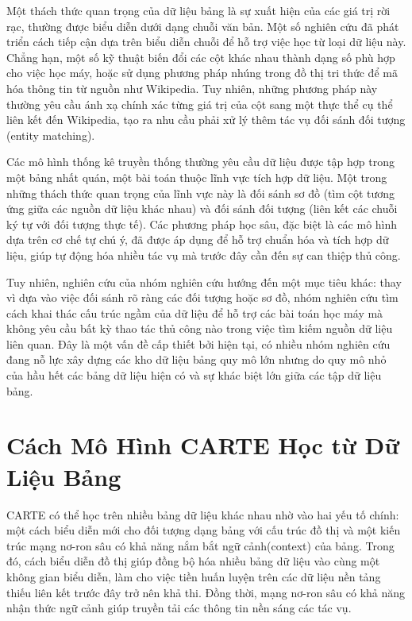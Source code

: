 \documentclass{article}
\begin{document}
Một thách thức quan trọng của dữ liệu bảng là sự xuất hiện của các giá trị rời rạc, thường được biểu diễn dưới dạng chuỗi văn bản. Một số nghiên cứu đã phát triển cách tiếp cận dựa trên biểu diễn chuỗi để hỗ trợ việc học từ loại dữ liệu này. Chẳng hạn, một số kỹ thuật biến đổi các cột khác nhau thành dạng số phù hợp cho việc học máy, hoặc sử dụng phương pháp nhúng trong đồ thị tri thức để mã hóa thông tin từ nguồn như Wikipedia. Tuy nhiên, những phương pháp này thường yêu cầu ánh xạ chính xác từng giá trị của cột sang một thực thể cụ thể liên kết đến Wikipedia, tạo ra nhu cầu phải xử lý thêm tác vụ đối sánh đối tượng (entity matching). 

Các mô hình thống kê truyền thống thường yêu cầu dữ liệu được tập hợp trong một bảng nhất quán, một bài toán thuộc lĩnh vực tích hợp dữ liệu. Một trong những thách thức quan trọng của lĩnh vực này là đối sánh sơ đồ (tìm cột tương ứng giữa các nguồn dữ liệu khác nhau) và đối sánh đối tượng (liên kết các chuỗi ký tự với đối tượng thực tế). Các phương pháp học sâu, đặc biệt là các mô hình dựa trên cơ chế tự chú ý, đã được áp dụng để hỗ trợ chuẩn hóa và tích hợp dữ liệu, giúp tự động hóa nhiều tác vụ mà trước đây cần đến sự can thiệp thủ công.

Tuy nhiên, nghiên cứu của nhóm nghiên cứu hướng đến một mục tiêu khác: thay vì dựa vào việc đối sánh rõ ràng các đối tượng hoặc sơ đồ, nhóm nghiên cứu tìm cách khai thác cấu trúc ngầm của dữ liệu để hỗ trợ các bài toán học máy mà không yêu cầu bất kỳ thao tác thủ công nào trong việc tìm kiếm nguồn dữ liệu liên quan. Đây là một vấn đề cấp thiết bởi hiện tại, có nhiều nhóm nghiên cứu đang nỗ lực xây dựng các kho dữ liệu bảng quy mô lớn nhưng do quy mô nhỏ của hầu hết các bảng dữ liệu hiện có và sự khác biệt lớn giữa các tập dữ liệu bảng. 

\section{Cách Mô Hình CARTE Học từ Dữ Liệu Bảng}
CARTE có thể học trên nhiều bảng dữ liệu khác nhau nhờ vào hai yếu tố chính: một cách biểu diễn mới cho đối tượng dạng bảng với cấu trúc đồ thị và một kiến trúc mạng nơ-ron sâu có khả năng nắm bắt ngữ cảnh(context) của bảng. Trong đó, cách biểu diễn đồ thị giúp đồng bộ hóa nhiều bảng dữ liệu vào cùng một không gian biểu diễn, làm cho việc tiền huấn luyện trên các dữ liệu nền tảng thiếu liên kết trước đây trở nên khả thi. Đồng thời, mạng nơ-ron sâu có khả năng nhận thức ngữ cảnh giúp truyền tải các thông tin nền sáng các tác vụ. 
\end{document}

